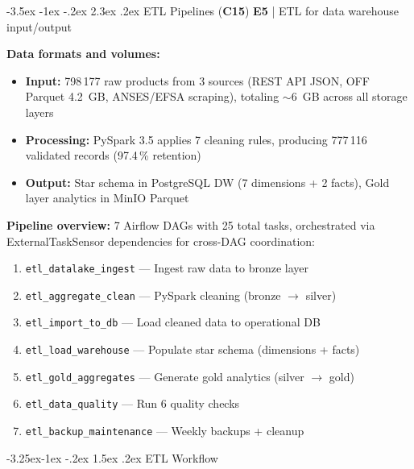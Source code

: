 \documentclass[a4paper,11pt,oneside,openany]{report}
\makeatletter
\renewcommand\section{\@startsection{section}{1}{\z@}%
  {-3.5ex \@plus -1ex \@minus -.2ex}%
  {2.3ex \@plus.2ex}%
  {\normalfont\Large\bfseries\color{ntgreen}}}
\renewcommand\subsection{\@startsection{subsection}{2}{\z@}%
  {-3.25ex\@plus -1ex \@minus -.2ex}%
  {1.5ex \@plus .2ex}%
  {\normalfont\large\bfseries\color{ntdarkgreen}}}
\newcommand{\competence}[1]{\textbf{\textcolor{ntgreen}{#1}}}
\newcommand{\evaluation}[1]{\textbf{\textcolor{ntblue}{#1}}}
\makeatother
\begin{document}
\section{ETL Pipelines (\competence{C15})}
\label{sec:c15}
{\small\evaluation{E5} | ETL for data warehouse input/output}

\textbf{Data formats and volumes:}
\begin{itemize}[nosep]
  \item \textbf{Input:} 798\,177 raw products from 3 sources (REST API JSON,
        OFF Parquet 4.2~GB, ANSES/EFSA scraping), totaling $\sim$6~GB across
        all storage layers
  \item \textbf{Processing:} PySpark 3.5 applies 7 cleaning rules, producing
        777\,116 validated records (97.4\,\% retention)
  \item \textbf{Output:} Star schema in PostgreSQL DW (7 dimensions + 2 facts),
        Gold layer analytics in MinIO Parquet
\end{itemize}

\textbf{Pipeline overview:} 7 Airflow DAGs with 25 total tasks, orchestrated
via ExternalTaskSensor dependencies for cross-DAG coordination:

\begin{enumerate}[nosep]
  \item \texttt{etl\_datalake\_ingest} --- Ingest raw data to bronze layer
  \item \texttt{etl\_aggregate\_clean} --- PySpark cleaning (bronze $\to$ silver)
  \item \texttt{etl\_import\_to\_db} --- Load cleaned data to operational DB
  \item \texttt{etl\_load\_warehouse} --- Populate star schema (dimensions + facts)
  \item \texttt{etl\_gold\_aggregates} --- Generate gold analytics (silver $\to$ gold)
  \item \texttt{etl\_data\_quality} --- Run 6 quality checks
  \item \texttt{etl\_backup\_maintenance} --- Weekly backups + cleanup
\end{enumerate}

\subsection{ETL Workflow}
\end{document}
